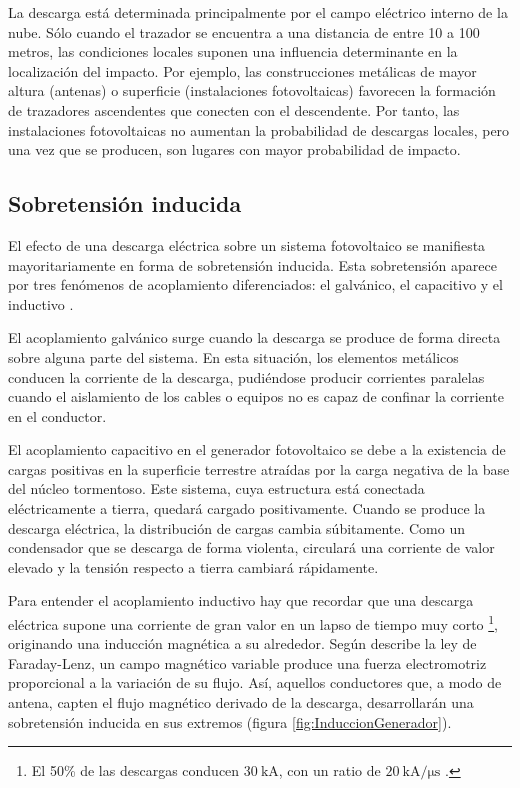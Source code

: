 La descarga está determinada principalmente por el campo eléctrico
interno de la nube. Sólo cuando el trazador se encuentra a una distancia
de entre 10 a 100 metros, las condiciones locales suponen una influencia
determinante en la localización del impacto. Por ejemplo, las construcciones
metálicas de mayor altura (antenas) o superficie (instalaciones fotovoltaicas)
favorecen la formación de trazadores ascendentes que conecten con
el descendente. Por tanto, las instalaciones fotovoltaicas no aumentan
la probabilidad de descargas locales, pero una vez que se producen,
son lugares con mayor probabilidad de impacto.


\subsection{Sobretensión inducida}

El efecto de una descarga eléctrica sobre un sistema fotovoltaico
se manifiesta mayoritariamente en forma de sobretensión inducida.
Esta sobretensión aparece por tres fenómenos de acoplamiento diferenciados:
el galvánico, el capacitivo y el inductivo \citep{Becker.Vaaben.ea2000}.

El acoplamiento galvánico surge cuando la descarga se produce de forma
directa sobre alguna parte del sistema. En esta situación, los elementos
metálicos conducen la corriente de la descarga, pudiéndose producir
corrientes paralelas cuando el aislamiento de los cables o equipos
no es capaz de confinar la corriente en el conductor.

El acoplamiento capacitivo en el generador fotovoltaico se debe a
la existencia de cargas positivas en la superficie terrestre atraídas
por la carga negativa de la base del núcleo tormentoso. Este sistema,
cuya estructura está conectada eléctricamente a tierra, quedará cargado
positivamente. Cuando se produce la descarga eléctrica, la distribución
de cargas cambia súbitamente. Como un condensador que se descarga
de forma violenta, circulará una corriente de valor elevado y la tensión
respecto a tierra cambiará rápidamente. 

Para entender el acoplamiento inductivo hay que recordar que una descarga
eléctrica supone una corriente de gran valor en un lapso de tiempo
muy corto%
\footnote{El 50\% de las descargas conducen $\SI{30}{\kilo\ampere}$, con un
ratio de $\SI{20}{\kilo\ampere\per\micro\second}$ \citep{Becker.Vaaben.ea2000}.%
}, originando una inducción magnética a su alrededor. Según describe
la ley de Faraday-Lenz, un campo magnético variable produce una fuerza
electromotriz proporcional a la variación de su flujo. Así, aquellos
conductores que, a modo de antena, capten el flujo magnético derivado
de la descarga, desarrollarán una sobretensión inducida en sus extremos
(figura \ref{fig:InduccionGenerador}).

